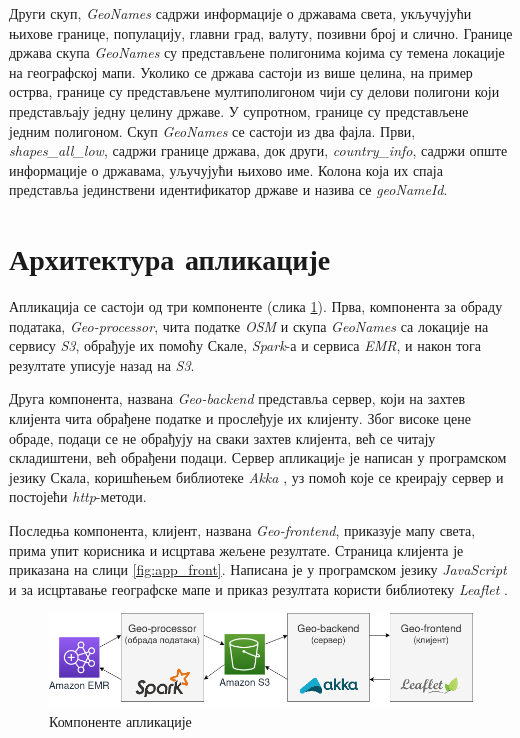 \documentclass[12pt,oneside]{memoir}
\begin{document}
Други скуп, \textit{GeoNames} \cite{geonames} садржи информације о државама света, укључујући њихове границе, популацију, главни град, валуту, позивни број и слично. Границе држава скупа \textit{GeoNames} су представљене полигонима којима су темена локације на географској мапи. Уколико се држава састоји из више целина, на пример острва, границе су представљене мултиполигоном чији су делови полигони који представљају једну целину државе. У супротном, границе су представљене једним полигоном. Скуп \textit{GeoNames} се састоји из два фајла. Први, \textit{shapes\_all\_low}, садржи границе држава, док други, \textit{country\_info}, садржи опште информације о државама, уључујући њихово име. Колона која их спаја представља јединствени идентификатор државе и назива се \textit{geoNameId}.

\section{Архитектура апликације}
\label{sec:app_aphi}

Апликација се састоји од три компоненте (слика \ref{fig:app_components}). Прва, компонента за обраду података, \textit{Geo-processor}, чита податке \textit{OSM} и скупа \textit{GeoNames} са локације на сервису \textit{S3}, обрађује их помоћу Скале, \textit{Spark}-а и сервиса \textit{EMR}, и након тога резултате уписује назад на \textit{S3}. 

Друга компонента, названа \textit{Geo-backend} представља сервер, који на захтев клијента чита обрађене податке и прослеђује их клијенту. Због високе цене обраде, подаци се не обрађују на сваки захтев клијента, већ се читају складиштени, већ обрађени подаци. Сервер апликацијe је написан у програмском језику Скала, коришћењем библиотеке \textit{Akka} \cite{scala_akka}, уз помоћ које се креирају сервер и постојећи \textit{http}-методи.

Последња компонента, клијент, названа \textit{Geo-frontend}, приказује мапу света, прима упит корисника и исцртава жељене резултате. Страница клијента је приказана на слици \ref{fig:app_front}. Написана је у програмском језику \textit{JavaScript} и за исцртавање географске мапе и приказ резултата користи библиотеку \textit{Leaflet} \cite{leaflet}.

\begin{figure}[!ht]
  \centering
  \includegraphics[width=1\textwidth]{pictures/app_arch_components.png}
  \caption{Компоненте апликације}
  \label{fig:app_components}
\end{figure}
\end{document}
